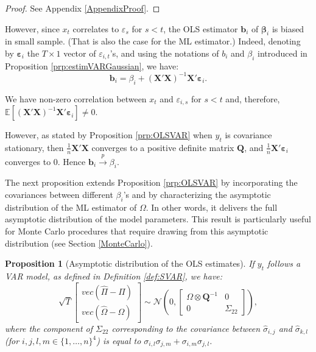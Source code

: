 \documentclass[
  11pt,
]{book}
\newtheorem{proposition}{Proposition}[chapter]
\theoremstyle{definition}
\theoremstyle{definition}
\theoremstyle{definition}
\theoremstyle{definition}
\theoremstyle{remark}
\begin{document}
\begin{proof}
See Appendix \ref{AppendixProof}.
\end{proof}

However, since \(x_t\) correlates to \(\varepsilon_s\) for \(s<t\), the OLS estimator \(\mathbf{b}_i\) of \(\boldsymbol\beta_i\) is biased in small sample. (That is also the case for the ML estimator.) Indeed, denoting by \(\boldsymbol\varepsilon_i\) the \(T \times 1\) vector of \(\varepsilon_{i,t}\)'s, and using the notations of \(b_i\) and \(\beta_i\) introduced in Proposition \ref{prp:estimVARGaussian}, we have:
\begin{equation}
\mathbf{b}_i = \beta_i + (\mathbf{X}'\mathbf{X})^{-1}\mathbf{X}'\boldsymbol\varepsilon_i.
\label{eq:olsar1}
\end{equation}

We have non-zero correlation between \(x_t\) and \(\varepsilon_{i,s}\) for \(s<t\) and, therefore, \(\mathbb{E}[(\mathbf{X}'\mathbf{X})^{-1}\mathbf{X}'\boldsymbol\varepsilon_i] \ne 0\).

However, as stated by Proposition \ref{prp:OLSVAR} when \(y_t\) is covariance stationary, then \(\frac{1}{n}\mathbf{X}'\mathbf{X}\) converges to a positive definite matrix \(\mathbf{Q}\), and \(\frac{1}{n}\mathbf{X}'\boldsymbol\varepsilon_i\) converges to 0. Hence \(\mathbf{b}_i \overset{p}{\rightarrow} \beta_i\).

The next proposition extends Proposition \ref{prp:OLSVAR} by incorporating the covariances between different \(\beta_i\)'s and by characterizing the asymptotic distribution of the ML estimator of \(\Omega\). In other words, it delivers the full asymptotic distribution of the model parameters. This result is particularly useful for Monte Carlo procedures that require drawing from this asymptotic distribution (see Section \ref{MonteCarlo}).

\begin{proposition}[Asymptotic distribution of the OLS estimates]
\protect\hypertarget{prp:OLSVAR2}{}\label{prp:OLSVAR2}If \(y_t\) follows a VAR model, as defined in Definition \ref{def:SVAR}, we have:
\begin{equation}
\sqrt{T}\left[
\begin{array}{c}
vec(\hat\Pi - \Pi)\\
vec(\hat\Omega - \Omega)
\end{array}
\right]
\sim \mathcal{N}\left(0,
\left[
\begin{array}{cc}
\Omega \otimes \mathbf{Q}^{-1} & 0\\
0 & \Sigma_{22}
\end{array}
\right]\right),
\label{eq:asymptPi}
\end{equation}
where the component of \(\Sigma_{22}\) corresponding to the covariance between \(\hat\sigma_{i,j}\) and \(\hat\sigma_{k,l}\) (for \(i,j,l,m \in \{1,\dots,n\}^4\)) is equal to \(\sigma_{i,l}\sigma_{j,m}+\sigma_{i,m}\sigma_{j,l}\).
\end{proposition}
\end{document}
